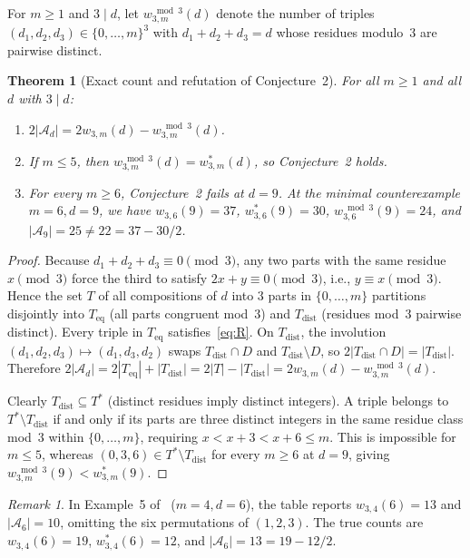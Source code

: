 \documentclass[11pt]{article}
\newtheorem{theorem}{Theorem}
\theoremstyle{remark}
\newtheorem{remark}{Remark}
\begin{document}
For $m \ge 1$ and $3 \mid d$, let $w^{\bmod 3}_{3,m}(d)$ denote the number of triples $(d_1, d_2, d_3) \in \{0, \dots, m\}^3$ with $d_1 + d_2 + d_3 = d$ whose residues modulo~$3$ are pairwise distinct.

\begin{theorem}[Exact count and refutation of Conjecture~2]\label{thm:c2}
For all $m \ge 1$ and all $d$ with $3 \mid d$:
\begin{enumerate}
\item $2|\mathcal{A}_d| = 2 w_{3,m}(d) - w^{\bmod 3}_{3,m}(d)$.
\item If $m \le 5$, then $w^{\bmod 3}_{3,m}(d) = w^*_{3,m}(d)$, so Conjecture~2 holds.
\item For every $m \ge 6$, Conjecture~2 fails at $d = 9$. At the minimal counterexample $m = 6, d = 9$, we have $w_{3,6}(9) = 37$, $w^*_{3,6}(9) = 30$, $w^{\bmod 3}_{3,6}(9) = 24$, and $|\mathcal{A}_9| = 25 \ne 22 = 37 - 30/2$.
\end{enumerate}
\end{theorem}

\begin{proof}
Because $d_1 + d_2 + d_3 \equiv 0 \pmod{3}$, any two parts with the same residue $x \pmod{3}$ force the third to satisfy $2x + y \equiv 0 \pmod{3}$, i.e., $y \equiv x \pmod{3}$. Hence the set $T$ of all compositions of $d$ into $3$ parts in $\{0, \dots, m\}$ partitions disjointly into $T_{\mathrm{eq}}$ (all parts congruent mod~$3$) and $T_{\mathrm{dist}}$ (residues mod~$3$ pairwise distinct). Every triple in $T_{\mathrm{eq}}$ satisfies~\eqref{eq:R}. On $T_{\mathrm{dist}}$, the involution $(d_1, d_2, d_3) \mapsto (d_1, d_3, d_2)$ swaps $T_{\mathrm{dist}} \cap D$ and $T_{\mathrm{dist}} \setminus D$, so $2|T_{\mathrm{dist}} \cap D| = |T_{\mathrm{dist}}|$. Therefore $2|\mathcal{A}_d| = 2|T_{\mathrm{eq}}| + |T_{\mathrm{dist}}| = 2|T| - |T_{\mathrm{dist}}| = 2 w_{3,m}(d) - w^{\bmod 3}_{3,m}(d)$.

Clearly $T_{\mathrm{dist}} \subseteq T^*$ (distinct residues imply distinct integers). A triple belongs to $T^* \setminus T_{\mathrm{dist}}$ if and only if its parts are three distinct integers in the same residue class mod~$3$ within $\{0, \dots, m\}$, requiring $x < x+3 < x+6 \le m$. This is impossible for $m \le 5$, whereas $(0, 3, 6) \in T^* \setminus T_{\mathrm{dist}}$ for every $m \ge 6$ at $d = 9$, giving $w^{\bmod 3}_{3,m}(9) < w^*_{3,m}(9)$.
\end{proof}

\begin{remark}
In Example~5 of~\cite[p.~18]{GudaySahin2026} ($m = 4, d = 6$), the table reports $w_{3,4}(6) = 13$ and $|\mathcal{A}_6| = 10$, omitting the six permutations of $(1, 2, 3)$. The true counts are $w_{3,4}(6) = 19$, $w^*_{3,4}(6) = 12$, and $|\mathcal{A}_6| = 13 = 19 - 12/2$.
\end{remark}
\end{document}
